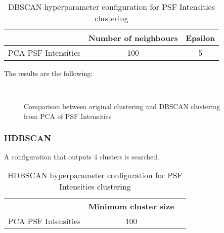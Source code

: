 			\begin{table}[h!]
				\centering
				\begin{tabular}{|c|c|c|}
					\hline
					& \textbf{Number of neighbours} & \textbf{Epsilon}\\
					\hline
					PCA PSF Intensities & 100 & 5\\
					\hline
				\end{tabular}
				\caption{DBSCAN hyperparameter configuration for PSF Intensities clustering}
			\end{table}
		
			The results are the following:
			
			\begin{figure*}[ht!]
				\centering
				\hspace{\fill}
				\\
					
				\hspace{\fill}
				\caption{Comparison between original clustering and DBSCAN clustering from PCA of PSF Intensities}
			\end{figure*}
			\FloatBarrier
			
		
		\subsubsection{HDBSCAN}
			
			A configuration that outputs 4 clusters is searched.
			
			\begin{table}[h!]
				\centering
				\begin{tabular}{|c|c|c|}
					\hline
					& \textbf{Minimum cluster size} \\
					\hline
					PCA PSF Intensities & 100 \\
					\hline
				\end{tabular}
				\caption{HDBSCAN hyperparameter configuration for PSF Intensities clustering}
			\end{table}
			\FloatBarrier
			
